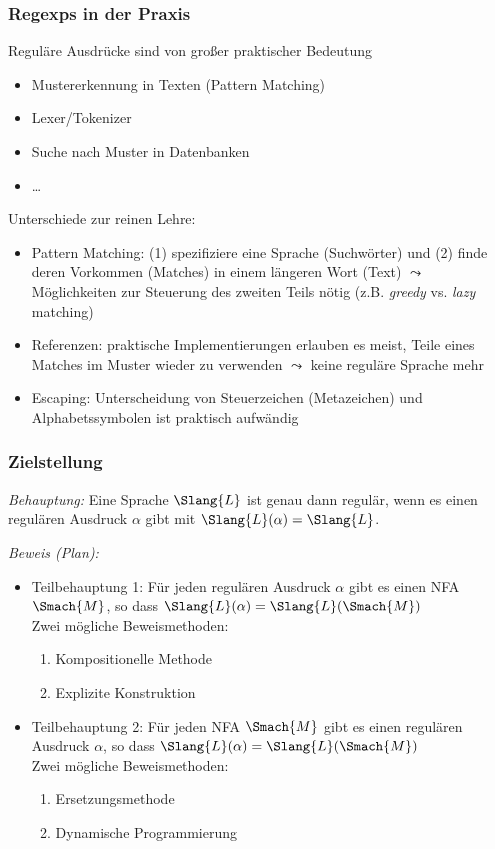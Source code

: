 \documentclass[aspectratio=1610,onlymath]{beamer}
\begin{document}
\begin{frame}\frametitle{Regexps in der Praxis}

Reguläre Ausdrücke sind von großer praktischer Bedeutung
\begin{itemize}
\item Mustererkennung in Texten (Pattern Matching)
\item Lexer/Tokenizer
\item Suche nach Muster in Datenbanken
\item \ldots
\end{itemize}\pause

Unterschiede zur reinen Lehre:
\begin{itemize}
\item \alert{Pattern Matching:} (1) spezifiziere eine Sprache (Suchwörter) und (2) finde deren Vorkommen (Matches) in einem längeren Wort (Text) $\leadsto$ Möglichkeiten zur Steuerung des zweiten Teils nötig (z.B. \emph{greedy} vs. \emph{lazy} matching)
\item \alert{Referenzen:} praktische Implementierungen erlauben es meist, Teile eines Matches im Muster wieder zu verwenden $\leadsto$ keine reguläre Sprache mehr
\item \alert{Escaping:} Unterscheidung von Steuerzeichen (Metazeichen) und Alphabetssymbolen ist praktisch aufwändig
\end{itemize}

\end{frame}


\begin{frame}\frametitle{Zielstellung}

\emph{Behauptung:} Eine Sprache $\Slang{L}$ ist genau dann regulär, wenn es einen regulären
Ausdruck $\alpha$ gibt mit $\Slang{L}(\alpha)=\Slang{L}$.
\medskip

\emph{Beweis (Plan):} 
\begin{itemize}
\item Teilbehauptung 1: \alert{Für jeden regulären Ausdruck $\alpha$ gibt es einen NFA $\Smach{M}$, so dass  $\Slang{L}(\alpha)=\Slang{L}(\Smach{M})$}\\[1ex]
Zwei mögliche Beweismethoden:
\begin{enumerate}[(1)]
\item Kompositionelle Methode
\item Explizite Konstruktion
\end{enumerate}
\item Teilbehauptung 2: \alert{Für jeden NFA $\Smach{M}$ gibt es einen regulären Ausdruck $\alpha$, so dass  $\Slang{L}(\alpha)=\Slang{L}(\Smach{M})$}\\[1ex]
Zwei mögliche Beweismethoden:
\begin{enumerate}[(1)]
\item Ersetzungsmethode
\item Dynamische Programmierung
\end{enumerate}
\end{itemize}

\end{frame}
\end{document}
